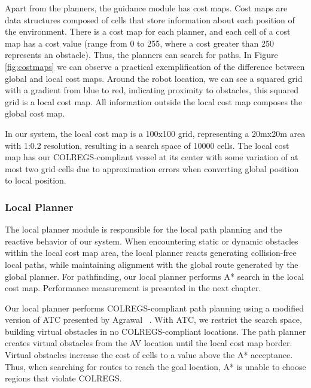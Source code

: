         Apart from the planners, the guidance module has cost maps. Cost maps are data structures composed of cells that store information about each position of the environment. There is a cost map for each planner, and each cell of a cost map has a cost value (range from 0 to 255, where a cost greater than 250 represents an obstacle). Thus, the planners can search for paths. In Figure \ref{fig:costmaps} we can observe a practical exemplification of the difference between global and local cost maps. Around the robot location, we can see a squared grid with a gradient from blue to red, indicating proximity to obstacles, this squared grid is a local cost map. All information outside the local cost map composes the global cost map.
        
        In our system, the local cost map is a 100x100 grid, representing a 20mx20m area with 1:0.2 resolution, resulting in a search space of 10000 cells. The local cost map has our \ac{COLREGS}-compliant vessel at its center with some variation of at most two grid cells due to approximation errors when converting global position to local position.

        \subsubsection{Local Planner}
        \label{sec:local_planner}
        
            The local planner module is responsible for the local path planning and the reactive behavior of our system. When encountering static or dynamic obstacles within the local cost map area, the local planner reacts generating collision-free local paths, while maintaining alignment with the global route generated by the global planner. For pathfinding, our local planner performs A* search in the local cost map. Performance measurement is presented in the next chapter. 
            
            Our local planner performs \ac{COLREGS}-compliant path planning using a modified version of \ac{ATC} presented by Agrawal \etal~\cite{Agrawal2015COLREGS}. With \ac{ATC}, we restrict the search space, building virtual obstacles in no \ac{COLREGS}-compliant locations. The path planner creates virtual obstacles from the \ac{AV} location until the local cost map border. Virtual obstacles increase the cost of cells to a value above the A* acceptance. Thus, when searching for routes to reach the goal location, A* is unable to choose regions that violate \ac{COLREGS}.
            
